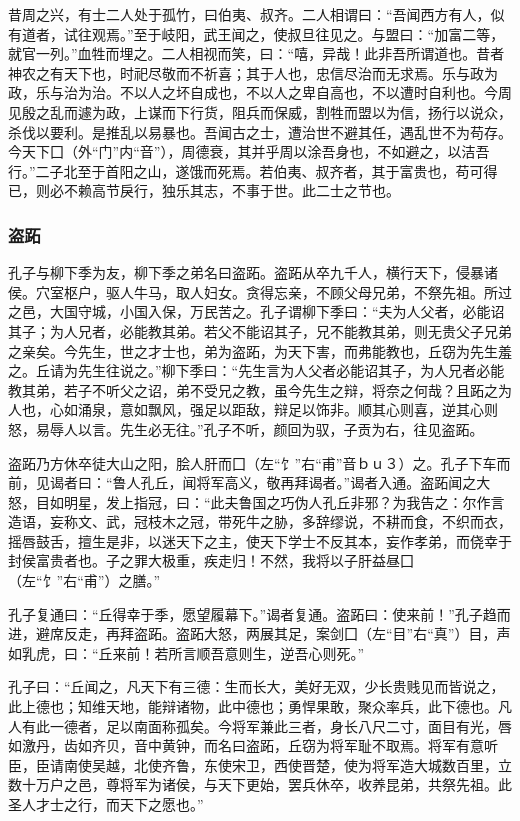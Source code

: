 \documentclass[]{article}
\begin{document}
昔周之兴，有士二人处于孤竹，曰伯夷、叔齐。二人相谓曰：``吾闻西方有人，似有道者，试往观焉。''至于岐阳，武王闻之，使叔旦往见之。与盟曰：``加富二等，就官一列。''血牲而埋之。二人相视而笑，曰：``嘻，异哉！此非吾所谓道也。昔者神农之有天下也，时祀尽敬而不祈喜；其于人也，忠信尽治而无求焉。乐与政为政，乐与治为治。不以人之坏自成也，不以人之卑自高也，不以遭时自利也。今周见殷之乱而遽为政，上谋而下行货，阻兵而保威，割牲而盟以为信，扬行以说众，杀伐以要利。是推乱以易暴也。吾闻古之士，遭治世不避其任，遇乱世不为苟存。今天下囗（外``门''内``音''），周德衰，其并乎周以涂吾身也，不如避之，以洁吾行。''二子北至于首阳之山，遂饿而死焉。若伯夷、叔齐者，其于富贵也，苟可得已，则必不赖高节戾行，独乐其志，不事于世。此二士之节也。

\hypertarget{header-n472}{%
\subsubsection{盗跖}\label{header-n472}}

孔子与柳下季为友，柳下季之弟名曰盗跖。盗跖从卒九千人，横行天下，侵暴诸侯。穴室枢户，驱人牛马，取人妇女。贪得忘亲，不顾父母兄弟，不祭先祖。所过之邑，大国守城，小国入保，万民苦之。孔子谓柳下季曰：``夫为人父者，必能诏其子；为人兄者，必能教其弟。若父不能诏其子，兄不能教其弟，则无贵父子兄弟之亲矣。今先生，世之才士也，弟为盗跖，为天下害，而弗能教也，丘窃为先生羞之。丘请为先生往说之。''柳下季曰：``先生言为人父者必能诏其子，为人兄者必能教其弟，若子不听父之诏，弟不受兄之教，虽今先生之辩，将奈之何哉？且跖之为人也，心如涌泉，意如飘风，强足以距敌，辩足以饰非。顺其心则喜，逆其心则怒，易辱人以言。先生必无往。''孔子不听，颜回为驭，子贡为右，往见盗跖。

盗跖乃方休卒徒大山之阳，脍人肝而囗（左``饣''右``甫''音ｂｕ３）之。孔子下车而前，见谒者曰：``鲁人孔丘，闻将军高义，敬再拜谒者。''谒者入通。盗跖闻之大怒，目如明星，发上指冠，曰：``此夫鲁国之巧伪人孔丘非邪？为我告之：尔作言造语，妄称文、武，冠枝木之冠，带死牛之胁，多辞缪说，不耕而食，不织而衣，摇唇鼓舌，擅生是非，以迷天下之主，使天下学士不反其本，妄作孝弟，而侥幸于封侯富贵者也。子之罪大极重，疾走归！不然，我将以子肝益昼囗（左``饣''右``甫''）之膳。''

孔子复通曰：``丘得幸于季，愿望履幕下。''谒者复通。盗跖曰：使来前！''孔子趋而进，避席反走，再拜盗跖。盗跖大怒，两展其足，案剑囗（左``目''右``真''）目，声如乳虎，曰：``丘来前！若所言顺吾意则生，逆吾心则死。''

孔子曰：``丘闻之，凡天下有三德：生而长大，美好无双，少长贵贱见而皆说之，此上德也；知维天地，能辩诸物，此中德也；勇悍果敢，聚众率兵，此下德也。凡人有此一德者，足以南面称孤矣。今将军兼此三者，身长八尺二寸，面目有光，唇如激丹，齿如齐贝，音中黄钟，而名曰盗跖，丘窃为将军耻不取焉。将军有意听臣，臣请南使吴越，北使齐鲁，东使宋卫，西使晋楚，使为将军造大城数百里，立数十万户之邑，尊将军为诸侯，与天下更始，罢兵休卒，收养昆弟，共祭先祖。此圣人才士之行，而天下之愿也。''
\end{document}
